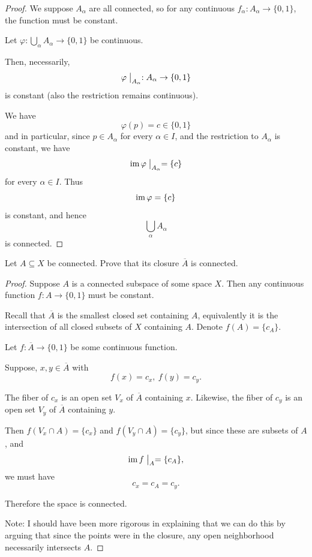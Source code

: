\documentclass[11pt]{article}
\begin{document}
\begin{proof}
    We suppose $A_\alpha$ are all connected, so 
    for any continuous $f_\alpha : A_\alpha \to \{0,1\}$, 
    the function must be constant. 

    Let $\varphi : \bigcup_{\alpha} A_\alpha \to \{0,1\}$ 
    be continuous. 

    Then, necessarily, 
    \[
        \varphi \bigm|_{A_\alpha} : A_\alpha \to     
        \{0,1\}
    \]
    is constant (also the restriction remains 
    continuous). 

    We have 
    \[
        \varphi(p) = c \in \{0,1\}
    \]
    and in particular, 
    since $p \in A_\alpha$ for every $\alpha \in I$, and 
    the restriction to $A_\alpha$ is constant, 
    we have 
    \[
        \operatorname{im}\varphi\bigm|_{A_\alpha} = \{c\} 
    \]
    for every $\alpha \in I$. Thus 
    \[
        \operatorname{im}\varphi = \{c\} 
    \]
    is constant, and hence 
    \[
        \bigcup_\alpha A_\alpha
    \]
    is connected.
\end{proof}

\begin{prob}
    Let $A\subseteq X$ be connected. Prove that its 
    closure $\overline A$ is connected. 
\end{prob}

\begin{proof}
    Suppose $A$ is a connected subspace of some 
    space $X$. Then any continuous function $f : A \to \{0,1\}$ 
    must be constant.  

    Recall that $\overline A$ is the smallest 
    closed set containing $A$, equivalently it is 
    the intersection of all closed 
    subsets of $X$ containing $A$.  
    Denote $f(A) = \{c_A\}$. 

    Let $f : \overline A \to \{0,1\}$ be some continuous 
    function. 

    Suppose, $x,y \in \overline A$ with 
    \[
        f(x) = c_x, \ f(y) = c_y. 
    \] 
    
    The fiber of $c_x$ is an open set $V_x$ of $\overline A$ 
    containing $x$.     
    Likewise, the fiber of $c_y$ is an open set
    $V_y$ of $\overline A$ containing $y$. 
    
    Then $f(V_x \cap A) = \{c_x\}$ and 
    $f(V_y \cap A) = \{c_y\}$, but since 
    these are subsets of $A$, and 
    \[
        \operatorname{im} f\bigm|_A = \{c_A\},
    \]
    we must have 
    \[
        c_x = c_A = c_y. 
    \]

    Therefore the space is connected. 

    Note: I should have been more rigorous 
    in explaining that we can do this by arguing that 
    since the points were in the closure, any open 
    neighborhood necessarily intersects $A$. 
    
\end{proof}
\end{document}
